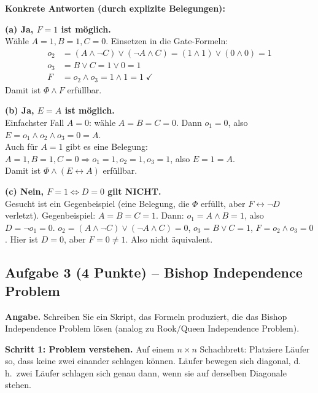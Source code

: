 \documentclass[a4paper,12pt]{article}
\begin{document}
\medskip
\textbf{Konkrete Antworten (durch explizite Belegungen):}

\smallskip
\textbf{(a) Ja, $F = 1$ ist m\"oglich.}\\
W\"ahle $A = 1, B = 1, C = 0$. Einsetzen in die Gate-Formeln:
\begin{align*}
o_2 &= (A \wedge \neg C) \vee (\neg A \wedge C)
     = (1 \wedge 1) \vee (0 \wedge 0) = 1 \\
o_3 &= B \vee C = 1 \vee 0 = 1 \\
F   &= o_2 \wedge o_3 = 1 \wedge 1 = 1 \;\checkmark
\end{align*}
Damit ist $\Phi \wedge F$ erf\"ullbar.

\smallskip
\textbf{(b) Ja, $E = A$ ist m\"oglich.}\\
Einfachster Fall $A = 0$: w\"ahle $A = B = C = 0$.
Dann $o_1 = 0$, also $E = o_1 \wedge o_2 \wedge o_3 = 0 = A$. \checkmark\\
Auch f\"ur $A = 1$ gibt es eine Belegung:
$A = 1, B = 1, C = 0 \Rightarrow o_1 = 1, o_2 = 1, o_3 = 1$,
also $E = 1 = A$. \checkmark\\
Damit ist $\Phi \wedge (E \leftrightarrow A)$ erf\"ullbar.

\smallskip
\textbf{(c) Nein, $F = 1 \Leftrightarrow D = 0$ gilt NICHT.}\\
Gesucht ist ein Gegenbeispiel (eine Belegung, die $\Phi$ erf\"ullt,
aber $F \leftrightarrow \neg D$ verletzt).
Gegenbeispiel: $A = B = C = 1$. Dann:
$o_1 = A \wedge B = 1$, also $D = \neg o_1 = 0$.
$o_2 = (A \wedge \neg C) \vee (\neg A \wedge C) = 0$,
$o_3 = B \vee C = 1$, $F = o_2 \wedge o_3 = 0$.
Hier ist $D = 0$, aber $F = 0 \neq 1$. Also nicht \"aquivalent.

\newpage

\subsection*{Aufgabe 3 \textnormal{(4 Punkte)} -- Bishop Independence
Problem}

\textbf{Angabe.} Schreiben Sie ein Skript, das Formeln produziert,
die das Bishop Independence Problem l\"osen (analog zu Rook/Queen
Independence Problem).

\medskip
\textbf{Schritt 1: Problem verstehen.}
Auf einem $n \times n$ Schachbrett: Platziere L\"aufer so, dass
keine zwei einander schlagen k\"onnen. L\"aufer bewegen sich
diagonal, d.\,h.\ zwei L\"aufer schlagen sich genau dann, wenn sie
auf derselben Diagonale stehen.
\end{document}
